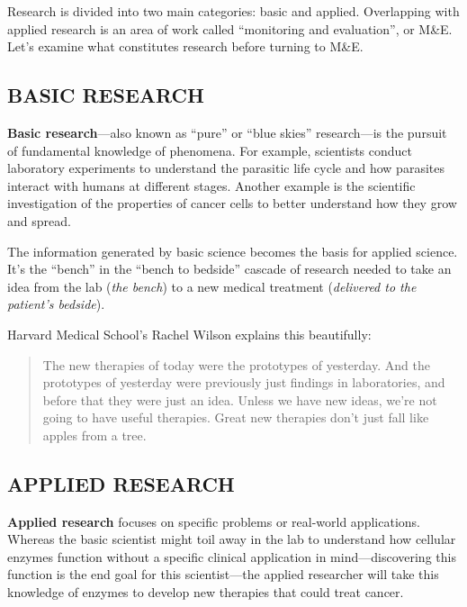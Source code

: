 \documentclass[justified,twoside,symmetric,]{tufte-book}
\begin{document}
Research is divided into two main categories: basic and applied. Overlapping with applied research is an area of work called ``monitoring and evaluation'', or M\&E. Let's examine what constitutes research before turning to M\&E.

\hypertarget{basic-research}{%
\subsection*{BASIC RESEARCH}\label{basic-research}}

\textbf{Basic research}---also known as ``pure'' or ``blue skies'' research---is the pursuit of fundamental knowledge of phenomena. For example, scientists conduct laboratory experiments to understand the parasitic life cycle and how parasites interact with humans at different stages. Another example is the scientific investigation of the properties of cancer cells to better understand how they grow and spread.

The information generated by basic science becomes the basis for applied science. It's the ``bench'' in the ``bench to bedside'' cascade of research needed to take an idea from the lab (\emph{the bench}) to a new medical treatment (\emph{delivered to the patient's bedside}).

Harvard Medical School's Rachel Wilson explains this beautifully:

\begin{quote}
The new therapies of today were the prototypes of yesterday. And the prototypes of yesterday were previously just findings in laboratories, and before that they were just an idea. Unless we have new ideas, we're not going to have useful therapies. Great new therapies don't just fall like apples from a tree.
\end{quote}

\hypertarget{applied-research}{%
\subsection*{APPLIED RESEARCH}\label{applied-research}}

\textbf{Applied research} focuses on specific problems or real-world applications. Whereas the basic scientist might toil away in the lab to understand how cellular enzymes function without a specific clinical application in mind---discovering this function is the end goal for this scientist---the applied researcher will take this knowledge of enzymes to develop new therapies that could treat cancer.
\end{document}
